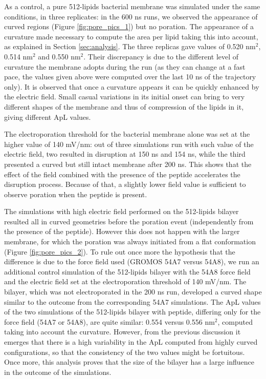 As a control, a pure 512-lipids bacterial membrane was simulated under the same conditions, in three replicates: in the 600 ns runs, we observed the appearance of curved regions (Figure \ref{fig:pore_pics_1}) but no poration.
%
The appearance of a curvature made necessary to compute the area per lipid taking this into account, as explained in Section \ref{sec:analysis}. The three replicas gave values of 0.520 nm$^2$, 0.514 nm$^2$ and 0.550 nm$^2$. Their discrepancy is due to the different level of curvature the membrane adopts during the run (as they can change at a fast pace, the values given above were computed over the last 10 ns of the trajectory only).
%
It is observed that once a curvature appears it can be quickly enhanced by the electric field. Small casual variations in its initial onset can bring to very different shapes of the membrane and thus of compression of the lipids in it, giving different ApL values.

The electroporation threshold for the bacterial membrane alone was set at the higher value of 140 mV/nm: out of three simulations run with such value of the electric field, two resulted in disruption at 150 ns and 154 ns, while the third presented a curved but still intact membrane after 200 ns.
%
This shows that the effect of the field combined with the presence of the peptide accelerates the disruption process. Because of that, a slightly lower field value is sufficient to observe poration when the peptide is present.

The simulations with high electric field performed on the 512-lipids bilayer resulted all in curved geometries before the poration event (independently from the presence of the peptide). However this does not happen with the larger membrane, for which the poration was always initiated from a flat conformation (Figure \ref{fig:pore_pics_2}).
%
To rule out once more the hypothesis that the difference is due to the force field used (GROMOS 54A7 versus 54A8), we run an additional control simulation of the 512-lipids bilayer with the 54A8 force field and the electric field set at the electroporation threshold of 140 mV/nm. The bilayer, which was not electroporated in the 200 ns run, developed a curved shape similar to the outcome from the corresponding 54A7 simulations.
%
The ApL values of the two simulations of the 512-lipids bilayer with peptide, differing only for the force field (54A7 or 54A8), are quite similar: 0.554 versus 0.556 nm$^2$, computed taking into account the curvature.
%
However, from the previous discussion it emerges that there is a high variability in the ApL computed from highly curved configurations, so that the consistency of the two values might be fortuitous.
%
Once more, this analysis proves that the size of the bilayer has a large influence in the outcome of the simulations.

